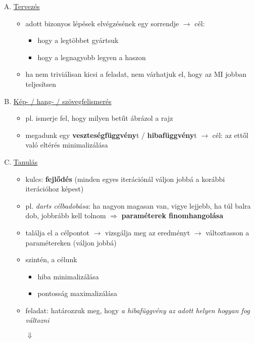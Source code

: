 \documentclass[a4paper, 11pt]{article}
\begin{document}
\begin{enumerate}[A)]
	\item \underline{Tervezés}
	\begin{itemize}
		\item adott bizonyos lépések elvégzésének egy sorrendje $\to$ cél:
		\begin{itemize}
			\item hogy a legtöbbet gyártsuk
			\item hogy a legnagyobb legyen a haszon
		\end{itemize}
		\item ha nem triviálisan kicsi a feladat, nem várhatjuk el, hogy az MI jobban teljesítsen
	\end{itemize}
	\item \underline{Kép- / hang- / szövegfelismerés}
	\begin{itemize}
		\item pl. ismerje fel, hogy milyen betűt ábrázol a rajz
		\item megadunk egy \textbf{veszteségfüggvény}t / \textbf{hibafüggvény}t $\to$ cél: az ettől való eltérés minimalizálása
	\end{itemize}
	\item \underline{Tanulás}
	\begin{itemize}
		\item kulcs: \textbf{fejlődés} (minden egyes iterációnál váljon jobbá a korábbi iterációhoz képest)
		\item pl. \textit{darts célbadobása}: ha nagyon magasan van, vigye lejjebb, ha túl balra dob, jobbrább kell tolnom $\Longrightarrow$ \textbf{paraméterek finomhangolása}
		\item találja el a célpontot $\to$ vizsgálja meg az eredményt $\to$ változtasson a paramétereken (váljon jobbá)
		\item szintén, a célunk
		\begin{itemize}
			\item hiba minimalizálása
			\item pontosság maximalizálása
		\end{itemize}
		\item feladat: határozzuk meg, hogy \textit{a hibafüggvény az adott helyen hogyan fog változni}
		\begin{center}
			$\Downarrow$
			

\end{center}
\end{itemize}
\end{enumerate}
\end{document}
